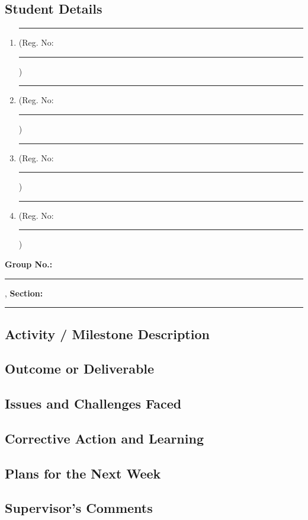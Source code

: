 \documentclass[a4paper]{article}
\begin{document}
\subsection{Student Details}
\begin{enumerate}[itemsep=0em]
\item \rule{8cm}{0.4pt} (Reg. No:\rule{2cm}{0.4pt})
\item \rule{8cm}{0.4pt} (Reg. No:\rule{2cm}{0.4pt})
\item \rule{8cm}{0.4pt} (Reg. No:\rule{2cm}{0.4pt})
\item \rule{8cm}{0.4pt} (Reg. No:\rule{2cm}{0.4pt})
\end{enumerate}
\textbf{Group No.:} \rule{4cm}{0.4pt}, \textbf{Section:} \rule{3.5cm}{0.4pt}

				 

\subsection*{Activity / Milestone Description}
\framebox[\textwidth][c]{\rule{0pt}{4cm}}

\subsection*{Outcome or Deliverable}
\framebox[\textwidth][c]{\rule{0pt}{4cm}}


\subsection*{Issues and Challenges Faced}
\framebox[\textwidth][c]{\rule{0pt}{4cm}}


\subsection*{Corrective Action and Learning}
\framebox[\textwidth][c]{\rule{0pt}{4cm}}


\subsection*{Plans for the Next Week}
\framebox[\textwidth][c]{\rule{0pt}{4cm}}

\subsection*{Supervisor's Comments}
\framebox[\textwidth][c]{\rule{0pt}{4cm}}\\[2em]
\end{document}
